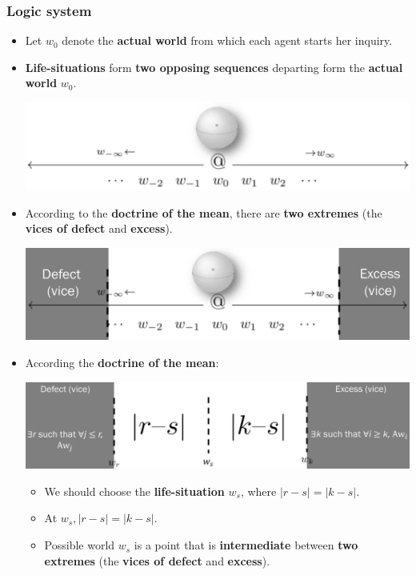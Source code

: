 \documentclass[11pt]{article}
\begin{document}
\subsubsection{Logic system}
\label{sec:orgb09eaf5}
\begin{itemize}
\item Let \(w_0\) denote the \textbf{actual world} from which each agent starts her inquiry.
\item \textbf{Life-situations} form \textbf{two opposing sequences} departing form the \textbf{actual world} \(w_0\).
\begin{center}
\includegraphics[width=.9\linewidth]{./images/logic-of-virtue-opposing-sequences.png}
\end{center}
\item According to the \textbf{doctrine of the mean}, there are \textbf{two extremes} (the \textbf{vices of defect} and \textbf{excess}).
\begin{center}
\includegraphics[width=.9\linewidth]{./images/logic-of-virtue-doctrine-of-the-mean.png}
\end{center}
\item According the \textbf{doctrine of the mean}:
\begin{center}
\includegraphics[width=.9\linewidth]{./images/logic-of-virtue-equation.png}
\end{center}
\begin{itemize}
\item We should choose the \textbf{life-situation} \(w_s\), where \(|r - s| = | k - s |\).
\item At \(w_s, | r - s | = | k - s |\).
\item Possible world \(w_s\) is a point that is \textbf{intermediate} between \textbf{two extremes} (the \textbf{vices of defect} and \textbf{excess}).
\end{itemize}
\end{itemize}
\end{document}
